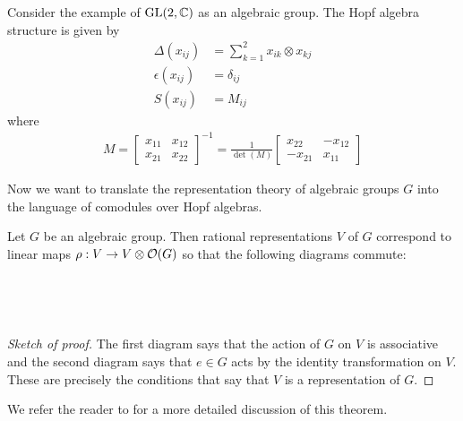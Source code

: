 \documentclass[12pt]{article}
\begin{document}
\begin{example}
    Consider the example of $\operatorname{GL}(2,\mathbb{C})$ as an algebraic group. The Hopf algebra structure is given by
    \begin{align*}
        \Delta(x_{ij}) &= \sum_{k=1}^2 x_{ik}\otimes x_{kj} \\
        \epsilon(x_{ij}) &= \delta_{ij} \\
        S(x_{ij}) &= M_{ij}
    \end{align*} where \begin{align*}
        M = \begin{bmatrix}
            x_{11} & x_{12} \\
            x_{21} & x_{22}
        \end{bmatrix}^{-1} = \frac{1}{\det(M)}\begin{bmatrix}
            x_{22} & -x_{12} \\
            -x_{21} & x_{11}
        \end{bmatrix}
    \end{align*}
\end{example}

\hfill

Now we want to translate the representation theory of algebraic groups $G$ into the language of comodules over Hopf algebras.
\begin{theorem}
    Let $G$ be an algebraic group. Then rational representations $V$ of $G$ 
    correspond to linear maps $\rho: V\to V\otimes \mathcal{O}(G)$ so that the following diagrams commute:
    \begin{center}
         \\

         \\
    \end{center}
\end{theorem}
\begin{proof}
    [Sketch of proof] The first diagram says that the action of $G$ on $V$ is associative 
    and the second diagram says that $e\in G$ acts by the identity transformation on $V$. 
    These are precisely the conditions that say that $V$ is a representation of $G$.
\end{proof}
We refer the reader to \cite{waterhouse} for a more detailed discussion of this theorem.
\end{document}
